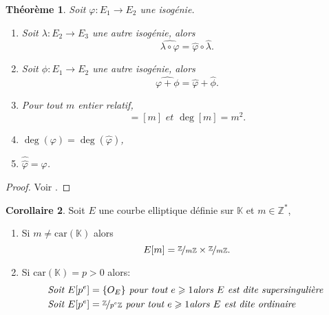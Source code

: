 \documentclass[10pt,a4paper]{book}
\theoremstyle{plain}
\newtheorem{thm}{Théorème}
\theoremstyle{definition}
\theoremstyle{definition}
\newtheorem{cor}[thm]{Corollaire}
\theoremstyle{definition}
\theoremstyle{definition}
\theoremstyle{remark}
\theoremstyle{remark}
\begin{document}
\begin{thm}
Soit $\varphi:E_1 \rightarrow E_2$ une isogénie.
\begin{enumerate}
\item Soit $\lambda:E_2 \rightarrow E_3$ une autre isogénie, alors
\begin{equation*}
\widehat{\lambda \circ \varphi}= \widehat{\varphi} \circ \widehat{\lambda}.
\end{equation*} 
\item Soit $\phi:E_1 \rightarrow E_2$ une autre isogénie, alors
\begin{equation*}
\widehat{\varphi+\phi}=\widehat{\varphi}+\widehat{\phi}.
\end{equation*}
\item Pour tout $m$ entier relatif,
\begin{equation*}
[\widehat{m}]=[m] \textit{ et } \deg[m]=m^2.
\end{equation*}
\item $\deg( \varphi)=\deg(\widehat{\varphi})$,
\item $\widehat{\widehat{\varphi}}=\varphi$.
\end{enumerate}
 
\end{thm}

\begin{proof}
Voir \cite[Theorem III.6.2]{Silv1}.
\end{proof}

\begin{cor}
Soit $E$ une courbe elliptique définie sur $\mathbb{K}$ et $m \in \mathbb{Z}^*$,
\begin{enumerate}
\item Si $m \neq \mathrm{car}(\mathbb{K})$ alors
\begin{equation*}
E[m]=\nicefrac{\mathbb{Z}}{m\mathbb{Z}} \times \nicefrac{\mathbb{Z}}{m\mathbb{Z}}. 
\end{equation*}
\item Si $\mathrm{car}(\mathbb{K})=p>0$ alors:
\begin{equation*}
\begin{alignedat}{1}
&\textit{Soit } E[p^e]=\{O_E\} \textit{ pour tout } e \geqslant 1 \textit{alors $E$ est dite supersingulière }\\
&\textit{Soit } E[p^e]=\nicefrac{\mathbb{Z}}{p^e\mathbb{Z}} \textit{ pour tout } e \geqslant 1
\textit{alors $E$ est dite ordinaire }\end{alignedat}
\end{equation*}
\end{enumerate}
\end{cor}
\end{document}

